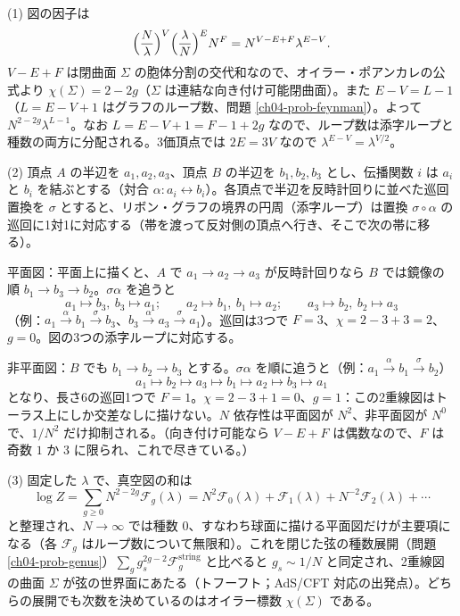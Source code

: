 \begin{solution}
(1) 図の因子は
\[
\Bigl(\frac N\lambda\Bigr)^V\Bigl(\frac\lambda N\Bigr)^EN^F=N^{V-E+F}\lambda^{E-V}.
\]
$V-E+F$ は閉曲面 $\Sigma$ の胞体分割の交代和なので、オイラー・ポアンカレの公式より $\chi(\Sigma)=2-2g$（$\Sigma$ は連結な向き付け可能閉曲面）。また $E-V=L-1$（$L=E-V+1$ はグラフのループ数、問題 \ref{ch04-prob-feynman}）。よって $N^{2-2g}\lambda^{L-1}$。なお $L=E-V+1=F-1+2g$ なので、ループ数は添字ループと種数の両方に分配される。3価頂点では $2E=3V$ なので $\lambda^{E-V}=\lambda^{V/2}$。

(2) 頂点 $A$ の半辺を $a_1,a_2,a_3$、頂点 $B$ の半辺を $b_1,b_2,b_3$ とし、伝播関数 $i$ は $a_i$ と $b_i$ を結ぶとする（対合 $\alpha\colon a_i\leftrightarrow b_i$）。各頂点で半辺を反時計回りに並べた巡回置換を $\sigma$ とすると、リボン・グラフの境界の円周（添字ループ）は置換 $\sigma\circ\alpha$ の巡回に1対1に対応する（帯を渡って反対側の頂点へ行き、そこで次の帯に移る）。

平面図：平面上に描くと、$A$ で $a_1\to a_2\to a_3$ が反時計回りなら $B$ では鏡像の順 $b_1\to b_3\to b_2$。$\sigma\alpha$ を追うと
\[
a_1\mapsto b_3,\ b_3\mapsto a_1;\qquad a_2\mapsto b_1,\ b_1\mapsto a_2;\qquad a_3\mapsto b_2,\ b_2\mapsto a_3
\]
（例：$a_1\xrightarrow{\alpha}b_1\xrightarrow{\sigma}b_3$、$b_3\xrightarrow{\alpha}a_3\xrightarrow{\sigma}a_1$）。巡回は3つで $F=3$、$\chi=2-3+3=2$、$g=0$。図の3つの添字ループに対応する。

非平面図：$B$ でも $b_1\to b_2\to b_3$ とする。$\sigma\alpha$ を順に追うと（例：$a_1\xrightarrow{\alpha}b_1\xrightarrow{\sigma}b_2$）
\[
a_1\mapsto b_2\mapsto a_3\mapsto b_1\mapsto a_2\mapsto b_3\mapsto a_1
\]
となり、長さ6の巡回1つで $F=1$。$\chi=2-3+1=0$、$g=1$：この2重線図はトーラス上にしか交差なしに描けない。$N$ 依存性は平面図が $N^2$、非平面図が $N^0$ で、$1/N^2$ だけ抑制される。（向き付け可能なら $V-E+F$ は偶数なので、$F$ は奇数 $1$ か $3$ に限られ、これで尽きている。）

(3) 固定した $\lambda$ で、真空図の和は
\[
\log Z=\sum_{g\ge0}N^{2-2g}\mathcal F_g(\lambda)=N^2\mathcal F_0(\lambda)+\mathcal F_1(\lambda)+N^{-2}\mathcal F_2(\lambda)+\cdots
\]
と整理され、$N\to\infty$ では種数 $0$、すなわち球面に描ける平面図だけが主要項になる（各 $\mathcal F_g$ はループ数について無限和）。これを閉じた弦の種数展開（問題 \ref{ch04-prob-genus}）$\sum_gg_s^{2g-2}\mathcal F_g^{\mathrm{string}}$ と比べると $g_s\sim1/N$ と同定され、2重線図の曲面 $\Sigma$ が弦の世界面にあたる（トフーフト；AdS/CFT 対応の出発点）。どちらの展開でも次数を決めているのはオイラー標数 $\chi(\Sigma)$ である。
\end{solution}
